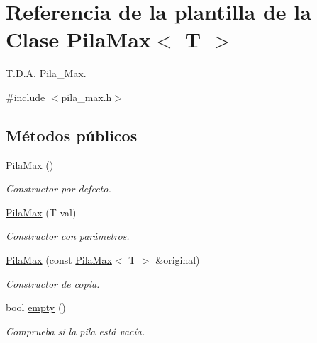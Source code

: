 \hypertarget{classPilaMax}{}\section{Referencia de la plantilla de la Clase Pila\+Max$<$ T $>$}
\label{classPilaMax}


T.\+D.\+A. Pila\+\_\+\+Max.  




{\ttfamily \#include $<$pila\+\_\+max.\+h$>$}

\subsection*{Métodos públicos}
\begin{DoxyCompactItemize}
\item 
\mbox{\label{classPilaMax_a75df9c3622957f933f913b2f09d7bca3}} 
\hyperlink{classPilaMax_a75df9c3622957f933f913b2f09d7bca3}{Pila\+Max} ()
\begin{DoxyCompactList}\small\item\em Constructor por defecto. \end{DoxyCompactList}\item 
\mbox{\label{classPilaMax_a65d381f2d58fa40b744535aa61a95646}} 
\hyperlink{classPilaMax_a65d381f2d58fa40b744535aa61a95646}{Pila\+Max} (T val)
\begin{DoxyCompactList}\small\item\em Constructor con parámetros. \end{DoxyCompactList}\item 
\hyperlink{classPilaMax_abbc833df3e55f3c4b8fc02fca156ca16}{Pila\+Max} (const \hyperlink{classPilaMax}{Pila\+Max}$<$ T $>$ \&original)
\begin{DoxyCompactList}\small\item\em Constructor de copia. \end{DoxyCompactList}\item 
\mbox{\label{classPilaMax_afbbe8f45bdb34b49047863b26bb86f60}} 
bool \hyperlink{classPilaMax_afbbe8f45bdb34b49047863b26bb86f60}{empty} ()
\begin{DoxyCompactList}\small\item\em Comprueba si la pila está vacía. \end{DoxyCompactList}\item 

\end{DoxyCompactItemize}
